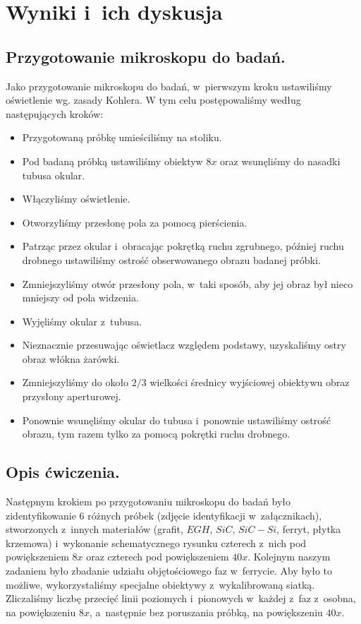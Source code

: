 \section{Wyniki i~ich dyskusja}

\subsection{Przygotowanie mikroskopu do badań.}

Jako przygotowanie mikroskopu do badań, w~pierwszym kroku ustawiliśmy oświetlenie wg. zasady Kohlera.
W tym celu postępowaliśmy według następujących kroków:
\begin{itemize}
    \item Przygotowaną próbkę umieściliśmy na stoliku.
    \item Pod badaną próbką ustawiliśmy obiektyw $8x$ oraz wsunęliśmy do nasadki tubusa okular.
    \item Włączyliśmy oświetlenie.
    \item Otworzyliśmy przesłonę pola za pomocą pierścienia.
    \item Patrząc przez okular i~obracając pokrętką ruchu zgrubnego, później ruchu drobnego ustawiliśmy ostrość obserwowanego obrazu badanej próbki.
    \item Zmniejszyliśmy otwór przesłony pola, w~taki sposób, aby jej obraz był nieco mniejszy od pola widzenia.
    \item Wyjęliśmy okular z~tubusa.
    \item Nieznacznie przesuwając oświetlacz względem podstawy, uzyskaliśmy ostry obraz włókna żarówki.
    \item Zmniejszyliśmy do około $2/3$ wielkości średnicy wyjściowej obiektywu obraz przysłony aperturowej.
    \item Ponownie wsunęliśmy okular do tubusa i~ponownie ustawiliśmy ostrość obrazu, tym razem tylko za pomocą pokrętki ruchu drobnego.
\end{itemize}

\subsection{Opis ćwiczenia.}

Następnym krokiem po przygotowaniu mikroskopu do badań było zidentyfikowanie 6 różnych próbek (zdjęcie identyfikacji w~załącznikach), stworzonych z~innych materiałów (grafit, $EGH$, $SiC$, $SiC-Si$, ferryt, płytka krzemowa) i~wykonanie schematycznego rysunku czterech z~nich pod powiększeniem $8x$ oraz czterech pod powiększeniem $40x$. Kolejnym naszym zadaniem było zbadanie udziału objętościowego faz w~ferrycie. Aby było to możliwe, wykorzystaliśmy specjalne obiektywy z~wykalibrowaną siatką. 
Zliczaliśmy liczbę przecięć linii poziomych i~pionowych w~każdej z~faz z~osobna, na powiększeniu $8x$, a~następnie bez poruszania próbką, na powiększeniu $40x$.

